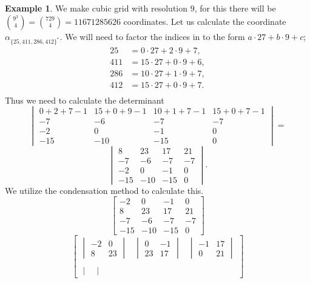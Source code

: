 \documentclass[a4paper,12pt]{book}
\theoremstyle{plain}
\theoremstyle{definition}
\newtheorem{Example}[equation]{Example}
\begin{document}
\begin{Example}
	We make cubic grid with resolution \( 9 \), for this there will be 
	\( {9^3 \choose 4} = {729 \choose 4} = 11 671 285 626 \) coordinates. Let
	us calculate the coordinate \( \alpha_{\{25, 411, 286, 412\}^*} \).
	We will need to factor the indices in to the form 
	\( a \cdot 27 + b \cdot 9 + c \);
	\begin{align*}
		25 &= 0 \cdot 27 + 2 \cdot 9 + 7, \\
		411 &= 15 \cdot 27 + 0 \cdot 9 + 6,\\
		286 &= 10 \cdot 27 + 1 \cdot 9 + 7,\\
		412 &= 15 \cdot 27 + 0 \cdot 9 + 7.\\
	\end{align*}
	Thus we need to calculate the determinant
	\[
		\begin{vmatrix}
			0 + 2 + 7 - 1 & 15 + 0 + 9 - 1 & 10 + 1 + 7 - 1 & 15 + 0 + 7 - 1 \\
			-7 & -6 & -7 & -7 \\
			-2 & 0 & -1 & 0 \\
			-15 & -10 & -15 & 0
		\end{vmatrix} =
	\]
	\[
		\begin{vmatrix}
			8 & 23 & 17 & 21 \\
			-7 & -6 & -7 & -7 \\
			-2 & 0 & -1 & 0 \\
			-15 & -10 & -15 & 0
		\end{vmatrix}.
	\]
	We utilize the condensation method to calculate this.
	\[
		\begin{bmatrix}
			-2  &   0 &  -1 &   0 \\
			 8  &  23 &  17 &  21 \\
			-7  &  -6 &  -7 &  -7 \\
			-15 & -10 & -15 &   0
		\end{bmatrix}
	\]
	\[
		\begin{bmatrix}
			\begin{vmatrix}
				-2 & 0 \\ 8 & 23
			\end{vmatrix} & \begin{vmatrix}
				0 & -1 \\ 23 & 17
			\end{vmatrix} & \begin{vmatrix}
				-1 & 17 \\ 0 & 21
			\end{vmatrix} \\ & & \\ \begin{vmatrix}

\end{vmatrix}
\end{bmatrix}\]
\end{Example}
\end{document}

